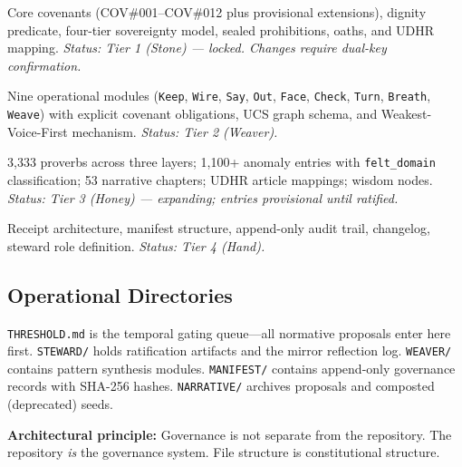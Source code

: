\documentclass[12pt,a4paper]{article}
\theoremstyle{definition}
\theoremstyle{remark}
\begin{document}
\begin{description}[leftmargin=2cm,style=nextline]
\item[\textbf{Slice A (Foundation)}]
  Core covenants (COV\#001--COV\#012 plus provisional extensions), dignity predicate,
  four-tier sovereignty model, sealed prohibitions, oaths, and UDHR mapping.
  \emph{Status: Tier 1 (Stone) — locked. Changes require dual-key confirmation.}

\item[\textbf{Slice B (Modules \& Voice)}]
  Nine operational modules (\texttt{Keep}, \texttt{Wire}, \texttt{Say}, \texttt{Out},
  \texttt{Face}, \texttt{Check}, \texttt{Turn}, \texttt{Breath}, \texttt{Weave}) with
  explicit covenant obligations, UCS graph schema, and Weakest-Voice-First mechanism.
  \emph{Status: Tier 2 (Weaver).}

\item[\textbf{Slice C (Wisdom)}]
  3{,}333 proverbs across three layers; 1{,}100+ anomaly entries with
  \texttt{felt\_domain} classification; 53 narrative chapters; UDHR article mappings;
  wisdom nodes.
  \emph{Status: Tier 3 (Honey) — expanding; entries provisional until ratified.}

\item[\textbf{Slice D (Interface \& Ledger)}]
  Receipt architecture, manifest structure, append-only audit trail, changelog, steward
  role definition.
  \emph{Status: Tier 4 (Hand).}
\end{description}

\subsection{Operational Directories}

\texttt{THRESHOLD.md} is the temporal gating queue—all normative proposals enter here
first. \texttt{STEWARD/} holds ratification artifacts and the mirror reflection log.
\texttt{WEAVER/} contains pattern synthesis modules. \texttt{MANIFEST/} contains
append-only governance records with SHA-256 hashes. \texttt{NARRATIVE/} archives
proposals and composted (deprecated) seeds.

\begin{mdframed}[style=canonframe]
\textbf{Architectural principle:} Governance is not separate from the repository. The
repository \emph{is} the governance system. File structure is constitutional structure.
\end{mdframed}

\end{document}
